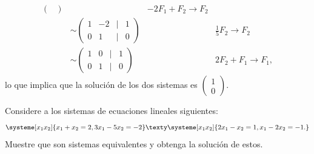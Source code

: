 \documentclass[compacto,10pt]{pubciencias-notas}
\begin{document}
\begin{ejem}
\begin{align*}
\begin{pmatrix}
    \end{pmatrix}
    && -2F_{1} + F_{2} \to F_{2}\\
    &\sim \begin{pmatrix}
    1&-2&|&1\\
    0&1&|&0
    \end{pmatrix}
    && \frac{1}{5}F_{2} \to F_{2}\\
    &\sim \begin{pmatrix}
    1& 0&|&1\\
    0&  1&|&0
    \end{pmatrix}
    && 2F_{2} + F_{1} \to F_{1},
\end{align*}
lo que implica que la solución de los dos sistemas es $\begin{pmatrix}1\\0\end{pmatrix}$.
\end{ejem}

\begin{ejer}\hspace{0pt}
Considere a los sistemas de ecuaciones lineales siguientes:
\[
    \systeme[x_1 x_2]{x_1 +x_2 = 2,
        3x_1 -5x_2 = - 2}
    \texty
    \systeme[x_1 x_2]{2x_1 -x_2 = 1,
        x_1 -2x_2 = - 1.}
\]
Muestre que son sistemas equivalentes y obtenga la solución de estos.
\end{ejer}
\end{document}
